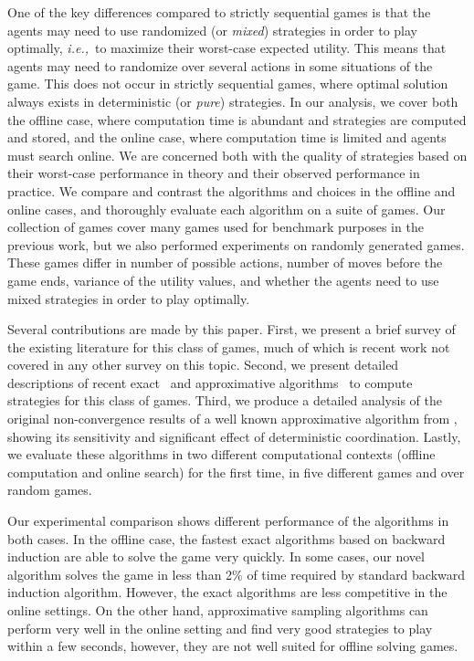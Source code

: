 \documentclass[preprint,12pt]{elsarticle}
\newcommand{\ie}{{\it i.e.,}~}
\begin{document}
One of the key differences compared to strictly sequential 
games is that the agents may need to use randomized (or \textit{mixed}) strategies in order to play optimally, 
\ie to maximize their worst-case expected utility.
This means that agents may need to randomize over several actions in some situations of the game. 
This does not occur in strictly sequential games, where optimal solution always exists in deterministic 
(or \textit{pure}) strategies.
In our analysis, we cover both the offline case, where computation time is 
abundant and strategies are computed and stored, and the online case, where computation time is limited and 
agents must search online. We are concerned both with the quality of strategies based on 
their worst-case performance in theory and their observed performance in practice. We compare and 
contrast the algorithms and choices in the offline and online cases, and thoroughly evaluate each 
algorithm on a suite of games. Our collection of games cover many games used for benchmark purposes
in the previous work, but we also performed experiments on randomly generated games. These games differ 
in number of possible actions, number of moves before the game ends, variance of the utility values,
and whether the agents need to use mixed strategies in order to play optimally.

Several contributions are made by this paper. First, we present a brief survey of the existing literature 
for this class of games, much of which is recent work not covered in any other survey on this topic. 
Second, we present detailed descriptions of recent exact~\cite{Bosansky13Using} and approximative algorithms~\cite{Lanctot13Goofspiel,lisy2013-nips} to compute strategies for this class of games. 
Third, we produce a detailed analysis of the original non-convergence results of a well known approximative algorithm from \cite{Shafiei09}, 
showing its sensitivity and significant effect of deterministic coordination. 
Lastly, we evaluate these algorithms in two different computational contexts (offline computation and online search) for 
the first time, in five different games and over random games. 

Our experimental comparison shows different performance of the algorithms in both cases.
In the offline case, the fastest exact algorithms based on backward induction are able to solve the game very quickly. 
In some cases, our novel algorithm solves the game in less than 2\% of time required by standard backward induction algorithm.
However, the exact algorithms are less competitive in the online settings. 
On the other hand, approximative sampling algorithms can perform very well in the online setting and 
find very good strategies to play within a few seconds, however, they are not well suited for offline solving games. 
\end{document}
